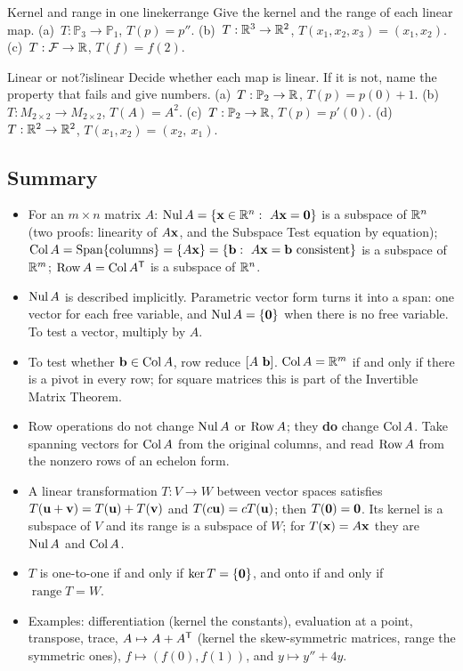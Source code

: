 \documentclass[11pt]{article}
\begin{document}
\begin{kc}{Kernel and range in one line}{kerrange}
Give the kernel and the range of each linear map. (a)~$T:\mathbb{P}_3\to\mathbb{P}_1$, $T(p)=p''$. (b)~$T:\mathbb{R}^3\to\mathbb{R}^2$, $T(x_1,x_2,x_3)=(x_1,x_2)$. (c)~$T:\mathcal{F}\to\mathbb{R}$, $T(f)=f(2)$.
\end{kc}

\begin{kc}{Linear or not?}{islinear}
Decide whether each map is linear. If it is not, name the property that fails and give numbers. (a)~$T:\mathbb{P}_2\to\mathbb{R}$, $T(p)=p(0)+1$. (b)~$T:M_{2\times2}\to M_{2\times2}$, $T(A)=A^2$. (c)~$T:\mathbb{P}_2\to\mathbb{R}$, $T(p)=p'(0)$. (d)~$T:\mathbb{R}^2\to\mathbb{R}^2$, $T(x_1,x_2)=(x_2,\ x_1)$.
\end{kc}

\subsection*{Summary}
\begin{itemize}
  \item For an $m\times n$ matrix $A$: $\Nul A=\{\bv{x}\in\R^n:\ A\bv{x}=\bv{0}\}$ is a subspace of $\mathbb{R}^n$ (two proofs: linearity of $A\mathbf{x}$, and the Subspace Test equation by equation); $\operatorname{Col} A=\operatorname{Span}\{\text{columns}\}=\{A\mathbf{x}\}=\{\mathbf{b}:\ A\mathbf{x}=\mathbf{b}\text{ consistent}\}$ is a subspace of $\mathbb{R}^m$; $\operatorname{Row} A=\operatorname{Col} A^{\mathsf T}$ is a subspace of $\mathbb{R}^n$.
  \item $\operatorname{Nul} A$ is described implicitly. Parametric vector form turns it into a span: one vector for each free variable, and $\operatorname{Nul} A=\{\mathbf{0}\}$ when there is no free variable. To test a vector, multiply by $A$.
  \item To test whether $\mathbf{b}\in\operatorname{Col} A$, row reduce $[A\ \mathbf{b}]$. $\operatorname{Col} A=\mathbb{R}^m$ if and only if there is a pivot in every row; for square matrices this is part of the Invertible Matrix Theorem.
  \item Row operations do not change $\operatorname{Nul} A$ or $\operatorname{Row} A$; they \textbf{do} change $\operatorname{Col} A$. Take spanning vectors for $\operatorname{Col} A$ from the original columns, and read $\operatorname{Row} A$ from the nonzero rows of an echelon form.
  \item A linear transformation $T:V\to W$ between vector spaces satisfies $T(\mathbf{u}+\mathbf{v})=T(\mathbf{u})+T(\mathbf{v})$ and $T(c\mathbf{u})=cT(\mathbf{u})$; then $T(\mathbf{0})=\mathbf{0}$. Its kernel is a subspace of $V$ and its range is a subspace of $W$; for $T(\mathbf{x})=A\mathbf{x}$ they are $\operatorname{Nul} A$ and $\operatorname{Col} A$.
  \item $T$ is one-to-one if and only if $\ker T=\{\mathbf{0}\}$, and onto if and only if $\operatorname{range}T=W$.
  \item Examples: differentiation (kernel the constants), evaluation at a point, transpose, trace, $A\mapsto A+A^{\mathsf T}$ (kernel the skew-symmetric matrices, range the symmetric ones), $f\mapsto(f(0),f(1))$, and $y\mapsto y''+4y$.
\end{itemize}
\end{document}
